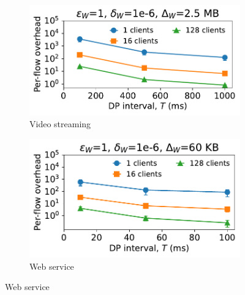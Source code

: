 \begin{figure}[t]
    \centering
    \begin{subfigure}{0.49\columnwidth}
        \centering
        \includegraphics[width=\textwidth]{overhead_vs_dp_interval_video_updated_no_max.pdf}
        \caption{Video streaming}
        \label{subfig:bw-vs-dpInt-video-no-max}
    \end{subfigure}
    \hfill
    \begin{subfigure}{0.49\columnwidth}
        \centering
        \includegraphics[width=\textwidth]{overhead_vs_dp_interval_web_updated_no_max.pdf}
        \caption{Web service}
        \label{subfig:bw-vs-dpInt-web-no-max}
    \end{subfigure}



\end{figure}
